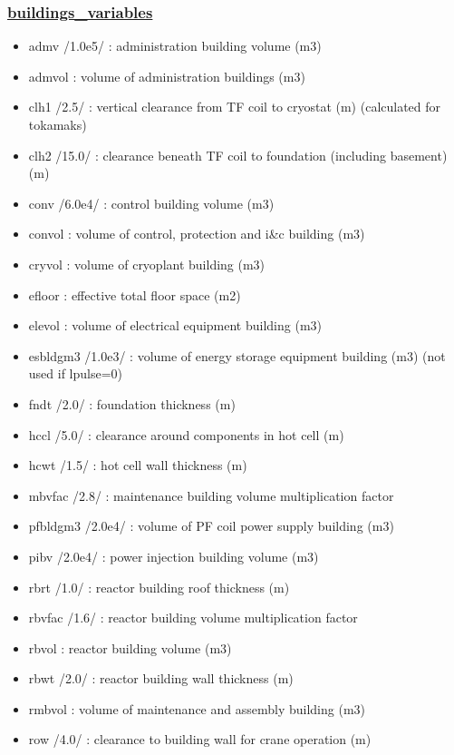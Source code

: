 \documentclass[]{article}
\begin{document}
\subsubsection{\href{buildings_variables.html}{buildings\_variables}}

\begin{itemize}
\itemsep1pt\parskip0pt
\item
  admv /1.0e5/ : administration building volume (m3)
\item
  admvol : volume of administration buildings (m3)
\item
  clh1 /2.5/ : vertical clearance from TF coil to cryostat (m)
  (calculated for tokamaks)
\item
  clh2 /15.0/ : clearance beneath TF coil to foundation (including
  basement) (m)
\item
  conv /6.0e4/ : control building volume (m3)
\item
  convol : volume of control, protection and i\&c building (m3)
\item
  cryvol : volume of cryoplant building (m3)
\item
  efloor : effective total floor space (m2)
\item
  elevol : volume of electrical equipment building (m3)
\item
  esbldgm3 /1.0e3/ : volume of energy storage equipment building (m3)
  (not used if lpulse=0)
\item
  fndt /2.0/ : foundation thickness (m)
\item
  hccl /5.0/ : clearance around components in hot cell (m)
\item
  hcwt /1.5/ : hot cell wall thickness (m)
\item
  mbvfac /2.8/ : maintenance building volume multiplication factor
\item
  pfbldgm3 /2.0e4/ : volume of PF coil power supply building (m3)
\item
  pibv /2.0e4/ : power injection building volume (m3)
\item
  rbrt /1.0/ : reactor building roof thickness (m)
\item
  rbvfac /1.6/ : reactor building volume multiplication factor
\item
  rbvol : reactor building volume (m3)
\item
  rbwt /2.0/ : reactor building wall thickness (m)
\item
  rmbvol : volume of maintenance and assembly building (m3)
\item
  row /4.0/ : clearance to building wall for crane operation (m)

\end{itemize}
\end{document}
